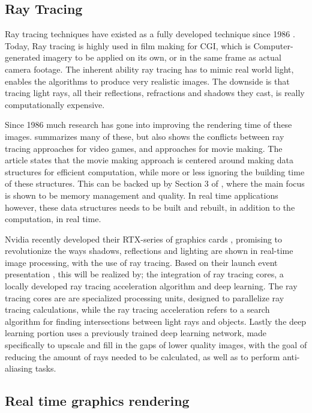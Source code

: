 \subsection{Ray Tracing}

Ray tracing techniques have existed as a fully developed technique since 1986 \cite{raytraceblog}. Today, Ray tracing is highly used in film making for CGI, which is Computer-generated imagery to be applied on its own, or in the same frame as actual camera footage. The inherent ability ray tracing has to mimic real world light, enables the algorithms to produce very realistic images. The downside is that tracing light rays, all their reflections, refractions and shadows they cast, is really computationally expensive.

Since 1986 much research has gone into improving the rendering time of these images. \cite{wald2009state} summarizes many of these, but also shows the conflicts between ray tracing approaches for video games, and approaches for movie making. The article states that the movie making approach is centered around making data structures for efficient computation, while more or less ignoring the building time of these structures. This can be backed up by Section 3 of \cite{carsmovie}, where the main focus is shown to be memory management and quality. In real time applications however, these data structures needs to be built and rebuilt, in addition to the computation, in real time. 

Nvidia recently developed their RTX-series of graphics cards \cite{raytraceblog}, promising to revolutionize the ways shadows, reflections and lighting are shown in real-time image processing, with the use of ray tracing. Based on their launch event presentation \cite{NvidiaConference}, this will be realized by; the integration of ray tracing cores, a locally developed ray tracing acceleration algorithm and deep learning. The ray tracing cores are are specialized processing units, designed to parallelize ray tracing calculations, while the ray tracing acceleration refers to a search algorithm for finding intersections between light rays and objects. Lastly the deep learning portion uses a previously trained deep learning network, made specifically to upscale and fill in the gaps of lower quality images, with the goal of reducing the amount of rays needed to be calculated, as well as to perform anti-aliasing tasks.

\subsection{Real time graphics rendering}

